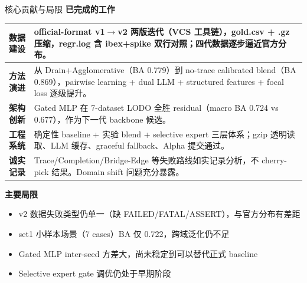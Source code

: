 \documentclass[aspectratio=169,UTF8]{ctexbeamer}
\renewcommand{\arraystretch}{1.18}
\begin{document}
\begin{frame}{核心贡献与局限}
  \large
  \textbf{已完成的工作}

  \vspace{3mm}
  \small
  \renewcommand{\arraystretch}{1.45}
  \begin{tabularx}{0.95\linewidth}{p{3.4cm}X}
    \toprule
    \textbf{数据建设} & official-format v1$\to$v2 两版迭代（VCS 工具链），gold.csv + .gz 压缩，regr.log 含 ibex+spike 双行对照；四代数据逐步逼近官方分布。\\
    \midrule
    \textbf{方法演进} & 从 Drain+Agglomerative（BA 0.779）到 no-trace calibrated blend（BA 0.869），pairwise learning + dual LLM + structured features + focal loss 逐级提升。\\
    \midrule
    \textbf{架构创新} & Gated MLP 在 7-dataset LODO 全胜 residual（macro BA 0.724 vs 0.677），作为下一代 backbone 候选。\\
    \midrule
    \textbf{工程系统} & 确定性 baseline + 实验 blend + selective expert 三层体系；gzip 透明读取、LLM 缓存、graceful fallback、Alpha 提交通过。\\
    \midrule
    \textbf{诚实记录} & Trace/Completion/Bridge-Edge 等失败路线如实记录分析，不 cherry-pick 结果。Domain shift 问题充分暴露。\\
    \bottomrule
  \end{tabularx}
  \renewcommand{\arraystretch}{1.18}

  \vspace{2mm}
  \textbf{主要局限}
  \begin{itemize}
    \item v2 数据失败类型仍单一（缺 FAILED/FATAL/ASSERT），与官方分布有差距
    \item set1 小样本场景（7 cases）BA 仅 0.722，跨域泛化仍不足
    \item Gated MLP inter-seed 方差大，尚未稳定到可以替代正式 baseline
    \item Selective expert gate 调优仍处于早期阶段
  \end{itemize}
\end{frame}
\end{document}

